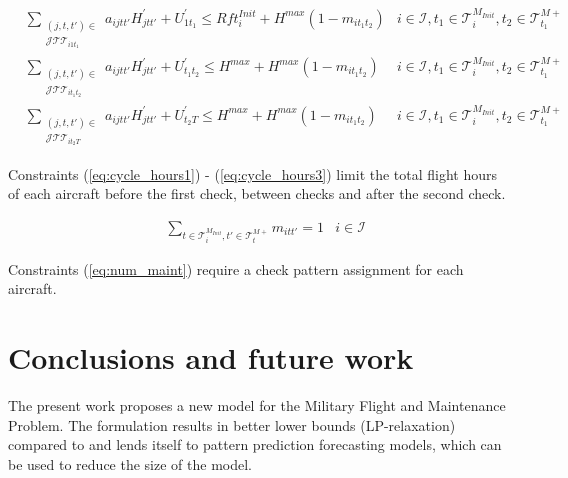\documentclass{roadef}
\begin{document}
    \begin{align}
        & \sum_{\substack{(j, t, t') \in \\ \mathcal{J}\mathcal{T}\mathcal{T}_{i1t_1}}} a_{ijtt'} H^\prime_{jtt'} + U^{\prime}_{1t_1} \leq Rft^{Init}_i + H^{max} (1 - m_{it_1t_2}) 
            & i \in \mathcal{I}, t_1 \in \mathcal{T}^{M_{Init}}_i, t_2 \in \mathcal{T}^{M+}_{t_1} \label{eq:cycle_hours1}\\
        & \sum_{\substack{(j, t, t') \in \\ \mathcal{J}\mathcal{T}\mathcal{T}_{it_1t_2}}} a_{ijtt'} H^\prime_{jtt'} + U^{\prime}_{t_1t_2} \leq H^{max} + H^{max} (1 - m_{it_1t_2}) 
            & i \in \mathcal{I}, t_1 \in \mathcal{T}^{M_{Init}}_i, t_2 \in \mathcal{T}^{M+}_{t_1} \label{eq:cycle_hours2}\\
        & \sum_{\substack{(j, t, t') \in \\ \mathcal{J}\mathcal{T}\mathcal{T}_{it_2T}}} a_{ijtt'} H^\prime_{jtt'} + U^{\prime}_{t_2T} \leq H^{max} + H^{max} (1 - m_{it_1t_2}) 
            & i \in \mathcal{I}, t_1 \in \mathcal{T}^{M_{Init}}_i, t_2 \in \mathcal{T}^{M+}_{t_1} \label{eq:cycle_hours3}
    \end{align}

    Constraints (\ref{eq:cycle_hours1}) - (\ref{eq:cycle_hours3}) limit the total flight hours of each aircraft before the first check, between checks and after the second check.

    \begin{align}
        & \sum_{t \in \mathcal{T}^{M_{Init}}_i, t' \in \mathcal{T}^{M+}_{t}} m_{itt'} =  1 
          & i \in \mathcal{I}\label{eq:num_maint}
    \end{align}

    Constraints (\ref{eq:num_maint}) require a check pattern assignment for each aircraft.

\section{Conclusions and future work}

    The present work proposes a new model for the Military Flight and Maintenance Problem. The formulation results in better lower bounds (LP-relaxation) compared to \cite{Peschiera2019} and lends itself to pattern prediction forecasting models, which can be used to reduce the size of the model.




\end{document}
